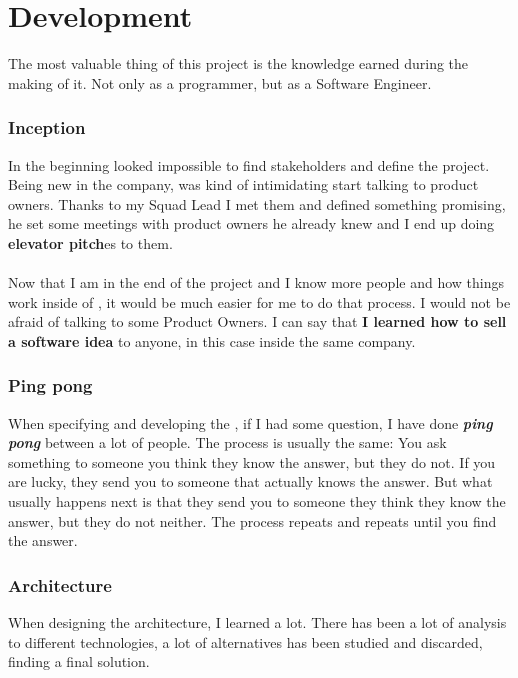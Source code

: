 \section{Development}

The most valuable thing of this project is the knowledge earned during the making of it. Not only as a programmer, but as a Software Engineer.

\subsubsection*{Inception}

In the beginning looked impossible to find stakeholders and define the project. Being new in the company, was kind of intimidating start talking to product owners. Thanks to my Squad Lead I met them and defined something promising, he set some meetings with product owners he already knew and I end up doing \textbf{elevator pitch}es to them.
\\\\
Now that I am in the end of the project and I know more people and how things work inside of \company, it would be much easier for me to do that process. I would not be afraid of talking to some Product Owners. I can say that \textbf{I learned how to sell a software idea} to anyone, in this case inside the same company.

\subsubsection*{Ping pong}

When specifying and developing the \thesis, if I had some question, I have done \textbf{\textit{ping pong}} between a lot of people. The process is usually the same: You ask something to someone you think they know the answer, but they do not. If you are lucky, they send you to someone that actually knows the answer. But what usually happens next is that they send you to someone they think they know the answer, but they do not neither. The process repeats and repeats until you find the answer.

\subsubsection*{Architecture}

When designing the architecture, I learned a lot. There has been a lot of analysis to different technologies, a lot of alternatives has been studied and discarded, finding a final solution.

